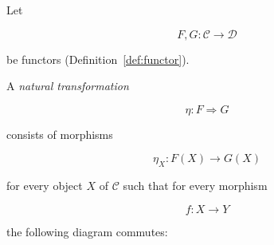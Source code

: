 \begin{definition}
\label{def:natural-transformation}

Let

$$
F,G : \mathcal{C} \to \mathcal{D}
$$

be functors (Definition~\ref{def:functor}).

A \emph{natural transformation}

$$
\eta : F \Rightarrow G
$$

consists of morphisms

$$
\eta_X : F(X) \to G(X)
$$

for every object $X$ of $\mathcal{C}$ such that for every morphism

$$
f : X \to Y
$$

the following diagram commutes:


\end{definition}
